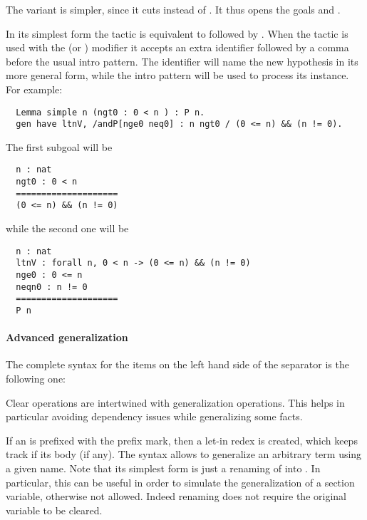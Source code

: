 The  variant is simpler, since it cuts
 instead of  . It thus
opens the goals   and .

In its simplest form
the  tactic
is equivalent to  followed by .
When the  tactic
is used with the  (or ) modifier it accepts an
extra identifier followed by a comma before the usual intro pattern.
The identifier will name the new hypothesis in its more general form,
while the intro pattern will be used to process its instance.  For example:
\begin{lstlisting}
  Lemma simple n (ngt0 : 0 < n ) : P n.
  gen have ltnV, /andP[nge0 neq0] : n ngt0 / (0 <= n) && (n != 0).
\end{lstlisting}
The first subgoal will be
\begin{lstlisting}
  n : nat
  ngt0 : 0 < n
  ====================
  (0 <= n) && (n != 0)
\end{lstlisting}
while the second one will be
\begin{lstlisting}
  n : nat
  ltnV : forall n, 0 < n -> (0 <= n) && (n != 0)
  nge0 : 0 <= n
  neqn0 : n != 0
  ====================
  P n
\end{lstlisting}

\paragraph{Advanced generalization}\label{par:advancedgen}
The complete syntax for the items on the left hand side of the \ssrC{/}
separator is the following one:
\begin{center}
 {\optsep}   {\optsep} \ssrC{(} \ssrC{:=} \ssrC{)}
\end{center}
Clear operations are intertwined with generalization operations. This
helps in particular avoiding dependency issues while generalizing some facts.

\noindent
If an  is prefixed with the  prefix mark, then a
let-in redex is created, which keeps track if its body (if any). The
syntax \ssrC{(}\ssrC{:=}\ssrC{)} allows to
generalize an arbitrary term using a given name.  Note that its simplest
form  is just a renaming of  into . In
particular, this can be useful in order to simulate the generalization
of a section variable, otherwise not allowed. Indeed renaming does not
require the original variable to be cleared.



